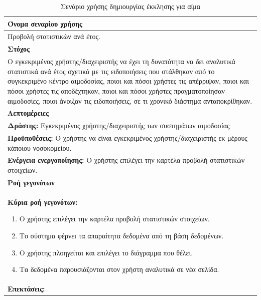 \begin{table}[H]
	\begin{center}
	    \begin{tabular}{|p{\dimexpr \linewidth-2\tabcolsep}|}
	    \hline
	    \rowcolor{grayy}
	    \textbf{Όνομα σεναρίου χρήσης}
	    \\ \hline    
	    Προβολή στατιστικών ανά έτος.
	     \\ \hline
	    \rowcolor{grayy}
	    \textbf{\textbf{Στόχος}}
	    \\ \hline
	 	 Ο εγκεκριμένος χρήστης/διαχειριστής να έχει τη δυνατότητα να δει αναλυτικά στατιστικά ανά έτος σχετικά με τις ειδοποιήσεις που στάλθηκαν από το συγκεκριμένο κέντρο αιμοδοσίας, ποιοι και πόσοι χρήστες τις απέρριψαν, ποιοι και πόσοι χρήστες τις αποδέχτηκαν, ποιοι και πόσοι χρήστες πραγματοποίησαν αιμοδοσίες, ποιοι άνοιξαν τις ειδοποιήσεις, σε τι χρονικό διάστημα ανταποκρίθηκαν.
	    \\ \hline
	    \rowcolor{grayy}
	    \textbf{Λεπτομέρειες}
	    \\ \hline
		\textbf{Δράστης:} Εγκεκριμένος χρήστης/διαχειριστής των συστημάτων αιμοδοσίας
		\\*
		\textbf{Προϋποθέσεις:} Ο χρήστης να είναι εγκεκριμένος χρήστης/διαχειριστής εκ μέρους κάποιου νοσοκομείου.
		\\*
		\textbf{Ενέργεια ενεργοποίησης:} Ο χρήστης επιλέγει την καρτέλα προβολή στατιστικών στοιχείων.
		\\ \hline
		\rowcolor{grayy}    
	    \textbf{Ροή γεγονότων}
	    \\ \hline
		\textbf{Κύρια ροή γεγονότων:}
		\begin{enumerate}
		\item	 Ο χρήστης επιλέγει την καρτέλα προβολή στατιστικών στοιχείων.
		\item Το σύστημα φέρνει τα απαραίτητα δεδομένα από τη βάση δεδομένων.
		\item Ο χρήστης πλοηγείται και επιλέγει το διάγραμμα που θέλει.
		\item Τα δεδομένα παρουσιάζονται στον χρήστη αναλυτικά  σε νέα σελίδα.
		\end{enumerate}
		\\ \hline
		\rowcolor{grayy}
		\textbf{Επεκτάσεις:}
		   \\ \hline
	    \end{tabular}
	    \caption{Σενάριο χρήσης δημιουργίας έκκλησης για αίμα}
	    \label{tab:view_year_statistics} 
	\end{center}
\end{table}

